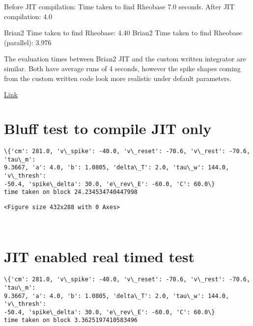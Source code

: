 \documentclass[11pt]{article}
\begin{document}
Before JIT compilation: Time taken to find Rheobase 7.0 seconds. After
JIT compilation: 4.0

Brian2 Time taken to find Rheobase: 4.40 Brian2 Time taken to find
Rheobase (parallel): 3.976

The evaluation times between Brian2 JIT and the custom written
integrator are similar. Both have average runs of 4 seconds, however the
spike shapes coming from the custom written code look more realistic
under default parameters.

\href{https://github.com/russelljjarvis/neuronunit/blob/master/neuronunit/unit_test/druckman_tests.ipynb}{Link}

    \hypertarget{bluff-test-to-compile-jit-only}{%
\section{Bluff test to compile JIT
only}\label{bluff-test-to-compile-jit-only}}

    \begin{Verbatim}[commandchars=\\\{\}]
\{'cm': 281.0, 'v\_spike': -40.0, 'v\_reset': -70.6, 'v\_rest': -70.6, 'tau\_m':
9.3667, 'a': 4.0, 'b': 1.0805, 'delta\_T': 2.0, 'tau\_w': 144.0, 'v\_thresh':
-50.4, 'spike\_delta': 30.0, 'e\_rev\_E': -60.0, 'C': 60.0\}
time taken on block 24.234534740447998
    \end{Verbatim}

    
    \begin{verbatim}
<Figure size 432x288 with 0 Axes>
    \end{verbatim}

    
    \begin{center}
    \end{center}
    { \hspace*{\fill} \\}
    
    \hypertarget{jit-enabled-real-timed-test}{%
\section{JIT enabled real timed
test}\label{jit-enabled-real-timed-test}}

    \begin{Verbatim}[commandchars=\\\{\}]
\{'cm': 281.0, 'v\_spike': -40.0, 'v\_reset': -70.6, 'v\_rest': -70.6, 'tau\_m':
9.3667, 'a': 4.0, 'b': 1.0805, 'delta\_T': 2.0, 'tau\_w': 144.0, 'v\_thresh':
-50.4, 'spike\_delta': 30.0, 'e\_rev\_E': -60.0, 'C': 60.0\}
time taken on block 3.3625197410583496
    \end{Verbatim}
\end{document}

